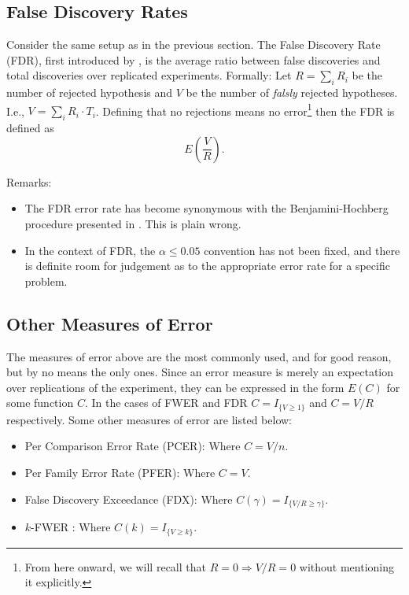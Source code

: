\documentclass[draft,12pt]{article}
\begin{document}
\subsection{\label{sub:fdr}False Discovery Rates}
Consider the same setup as in the previous section. The False Discovery Rate (FDR), first introduced by \citet{benjamini_controlling_1995}, is the average ratio between false discoveries and total discoveries over replicated experiments.
Formally: Let $R=\sum_i{R_i}$ be the number of rejected hypothesis and $V$ be the number of \emph{falsly} rejected hypotheses. I.e., $V=\sum_i{R_i \cdot T_i}$. Defining that no rejections means no error\footnote{ From here onward, we will recall that $R=0 \Rightarrow V/R=0$ without mentioning it explicitly.} then the FDR is defined as $$E \left( \frac{V}{R} \right).$$

Remarks:
\begin{itemize}
\item The FDR error rate has become synonymous with the Benjamini-Hochberg procedure presented in \citet{benjamini_controlling_1995} . This is plain wrong.
\item In the context of FDR, the $\alpha \leq 0.05$ convention has not been fixed, and there is definite room for judgement as to the appropriate error rate for a specific problem.
\end{itemize}




\subsection{Other Measures of Error}
The measures of error above are the most commonly used, and for good reason, but by no means the only ones. Since an error measure is merely an expectation over replications of the experiment, they can be expressed in the form $E(C)$ for some function $C$. In the cases of FWER and FDR $C = I_{\{ V \geq 1 \} } $ and $C = V/R$ respectively.
Some other measures of error are listed below:

\begin{itemize}
\item Per Comparison Error Rate (PCER): Where $C=V/n$.
\item Per Family Error Rate (PFER): Where $C=V$.
\item False Discovery Exceedance (FDX)\citep{genovese_exceedance_2006}: Where $C(\gamma) = I_{\{ V/R \geq \gamma \} }$.
\item $k$-FWER \citep{van_der_laan_augmentation_2004}: Where $C(k) = I_{\{ V \geq k \} }$.
\end{itemize}
\end{document}
